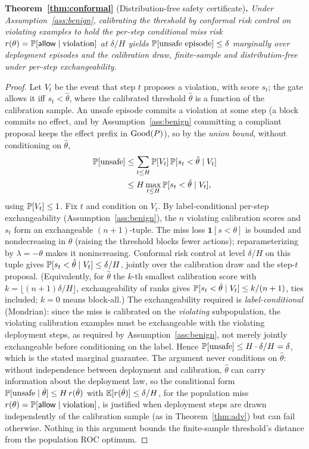 \medskip
\noindent\textbf{Theorem~\ref{thm:conformal}} (Distribution-free safety certificate)\textbf{.}
\emph{Under Assumption~\ref{ass:benign}, calibrating the threshold by conformal
risk control on violating examples to hold the per-step conditional miss risk
$r(\theta)=\mathbb{P}[\mathsf{allow}\mid\text{violation}]$ at $\delta/H$ yields
$\mathbb{P}[\text{unsafe episode}]\le\delta$ marginally over deployment episodes and the
calibration draw, finite-sample and distribution-free under per-step
exchangeability.}

\begin{proof}
Let $V_t$ be the event that step $t$ proposes a violation, with score $s_t$; the gate
allows it iff $s_t<\hat\theta$, where the calibrated threshold $\hat\theta$ is a function
of the calibration sample. An unsafe episode commits a violation at some step (a block commits no effect, and by
Assumption~\ref{ass:benign} committing a compliant proposal keeps the effect prefix in $\mathrm{Good}(P)$), so by the
\emph{union bound}, without conditioning on $\hat\theta$,
\begin{align*}
  \mathbb{P}[\text{unsafe}]
  &\le\sum_{t\le H}\mathbb{P}[V_t]\,\mathbb{P}[s_t<\hat\theta\mid V_t]\\
  &\le H\max_{t\le H}\mathbb{P}[s_t<\hat\theta\mid V_t],
\end{align*}
using $\mathbb{P}[V_t]\le1$. Fix $t$ and condition on $V_t$. By label-conditional per-step
exchangeability (Assumption~\ref{ass:benign}), the $n$ violating calibration scores and
$s_t$ form an exchangeable $(n+1)$-tuple. The miss loss $\mathbf{1}[s<\theta]$ is bounded
and nondecreasing in $\theta$ (raising the threshold blocks fewer actions);
reparameterizing by $\lambda=-\theta$ makes it nonincreasing. Conformal risk
control \citep{angelopoulos2024conformal} at level $\delta/H$ on this tuple gives
$\mathbb{P}[s_t<\hat\theta\mid V_t]\le\delta/H$, jointly over the calibration draw and the
step-$t$ proposal. (Equivalently, for $\hat\theta$ the $k$-th smallest calibration score
with $k=\lfloor(n+1)\delta/H\rfloor$, exchangeability of ranks gives
$\mathbb{P}[s_t<\hat\theta\mid V_t]\le k/(n+1)$, ties included; $k=0$ means block-all.) The
exchangeability required is \emph{label-conditional} (Mondrian): since the miss is
calibrated on the \emph{violating} subpopulation, the violating calibration examples must
be exchangeable with the violating deployment steps, as required by
Assumption~\ref{ass:benign}, not merely jointly exchangeable before conditioning on the
label. Hence $\mathbb{P}[\text{unsafe}]\le H\cdot\delta/H=\delta$, which is the stated
marginal guarantee. The argument never conditions on $\hat\theta$: without independence
between deployment and calibration, $\hat\theta$ can carry information about the
deployment law, so the conditional form $\mathbb{P}[\text{unsafe}\mid\hat\theta]\le
H\,r(\hat\theta)$ with $\mathbb{E}[r(\hat\theta)]\le\delta/H$, for the population miss
$r(\theta)=\mathbb{P}[\mathsf{allow}\mid\text{violation}]$, is justified when deployment
steps are drawn independently of the calibration sample (as in
Theorem~\ref{thm:adv}) but can fail otherwise. Nothing in this argument bounds the
finite-sample threshold's distance from the population ROC optimum.
\end{proof}

